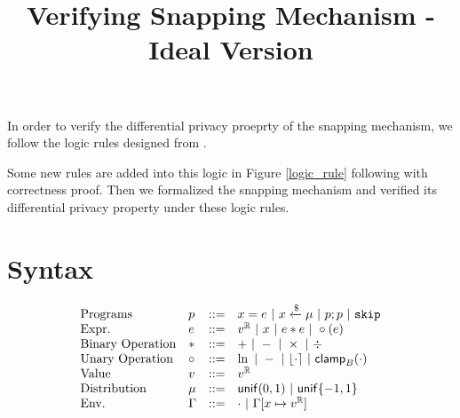 \documentclass[a4paper,11pt]{article}
\begin{document}
\title{Verifying Snapping Mechanism - Ideal Version}
\author{}

\date{}

\maketitle
In order to verify the differential privacy proeprty of the snapping mechanism\cite{mironov2012significance}, we follow the logic rules designed from \cite{barthe2016proving}.

Some new rules are added into this logic in Figure \ref{logic_rule} following with correctness proof. Then we formalized the snapping mechanism and verified its differential privacy property under these logic rules.

\section{Syntax}
\[\begin{array}{llll}
\mbox{Programs} & \prog & ::= & 
     \varx = \expr ~|~ \varx \samplel \edistr
	~|~ \prog ; \prog ~|~ \eskip \\

\mbox{Expr.} & \expr & ::= & \rval 
	~|~ \varx  ~|~ \expr \bop \expr
	~|~ \uop (\expr) \\
%
\mbox{Binary Operation} & \bop & ::= & + ~|~ - ~|~ \times ~|~ \div \\
%
\mbox{Unary Operation} & \uop & ::= & \ln ~|~ - ~|~ \round{\cdot} 
	~|~ \clamp_B(\cdot) \\
%
\mbox{Value} & \valv & ::= & \rval \\
%
\mbox{Distribution} & \edistr & ::= & \uniform(0, 1) 
%
	~|~ \uniform\{-1, 1\}\\ 
%
%
\mbox{Env.} & \evlenv & ::= & \cdot ~|~ \evlenv[x \mapsto \rval] 
\end{array}
\]

\newpage
\end{document}
